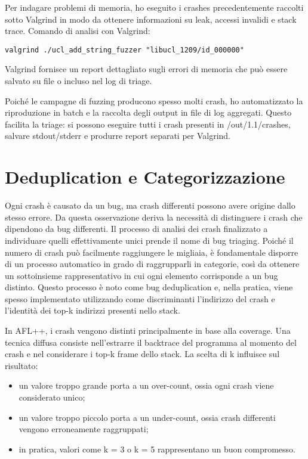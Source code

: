 Per indagare problemi di memoria, ho eseguito i crashes precedentemente raccolti sotto Valgrind in modo da ottenere informazioni su leak, accessi invalidi e stack trace.
Comando di analisi con Valgrind:

\begin{center}
\texttt{valgrind ./ucl\_add\_string\_fuzzer "libucl\_1209/id\_000000"}
\end{center}

Valgrind fornisce un report dettagliato sugli errori di memoria che può essere salvato su file o incluso nel log di triage.

Poiché le campagne di fuzzing producono spesso molti crash, ho automatizzato la riproduzione in batch e la raccolta degli output in file di log aggregati. Questo facilita la triage: si possono eseguire tutti i crash presenti in /out/1.1/crashes, salvare stdout/stderr e produrre report separati per Valgrind.

\section{Deduplication e Categorizzazione}

Ogni crash è causato da un bug, ma crash differenti possono avere origine dallo stesso errore. Da questa osservazione deriva la necessità di distinguere i crash che dipendono da bug differenti. Il processo di analisi dei crash finalizzato a individuare quelli effettivamente unici prende il nome di bug triaging. Poiché il numero di crash può facilmente raggiungere le migliaia, è fondamentale disporre di un processo automatico in grado di raggrupparli in categorie, così da ottenere un sottoinsieme rappresentativo in cui ogni elemento corrisponde a un bug distinto. Questo processo è noto come bug deduplication e, nella pratica, viene spesso implementato utilizzando come discriminanti l’indirizzo del crash e l’identità dei top-k indirizzi presenti nello stack.

In AFL++, i crash vengono distinti principalmente in base alla coverage. Una tecnica diffusa consiste nell’estrarre il backtrace del programma al momento del crash e nel considerare i top-k frame dello stack. La scelta di k influisce sul risultato:

\begin{itemize}
    \item un valore troppo grande porta a un over-count, ossia ogni crash viene considerato unico;
    \item un valore troppo piccolo porta a un under-count, ossia crash differenti vengono erroneamente raggruppati;
    \item in pratica, valori come k = 3 o k = 5 rappresentano un buon compromesso.
\end{itemize}

